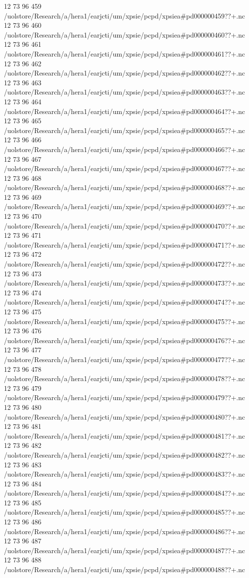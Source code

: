 12 73 96
459
/uolstore/Research/a/hera1/earjcti/um/xpsie/pcpd/xpsiea#pd000000459??+.nc
12 73 96
460
/uolstore/Research/a/hera1/earjcti/um/xpsie/pcpd/xpsiea#pd000000460??+.nc
12 73 96
461
/uolstore/Research/a/hera1/earjcti/um/xpsie/pcpd/xpsiea#pd000000461??+.nc
12 73 96
462
/uolstore/Research/a/hera1/earjcti/um/xpsie/pcpd/xpsiea#pd000000462??+.nc
12 73 96
463
/uolstore/Research/a/hera1/earjcti/um/xpsie/pcpd/xpsiea#pd000000463??+.nc
12 73 96
464
/uolstore/Research/a/hera1/earjcti/um/xpsie/pcpd/xpsiea#pd000000464??+.nc
12 73 96
465
/uolstore/Research/a/hera1/earjcti/um/xpsie/pcpd/xpsiea#pd000000465??+.nc
12 73 96
466
/uolstore/Research/a/hera1/earjcti/um/xpsie/pcpd/xpsiea#pd000000466??+.nc
12 73 96
467
/uolstore/Research/a/hera1/earjcti/um/xpsie/pcpd/xpsiea#pd000000467??+.nc
12 73 96
468
/uolstore/Research/a/hera1/earjcti/um/xpsie/pcpd/xpsiea#pd000000468??+.nc
12 73 96
469
/uolstore/Research/a/hera1/earjcti/um/xpsie/pcpd/xpsiea#pd000000469??+.nc
12 73 96
470
/uolstore/Research/a/hera1/earjcti/um/xpsie/pcpd/xpsiea#pd000000470??+.nc
12 73 96
471
/uolstore/Research/a/hera1/earjcti/um/xpsie/pcpd/xpsiea#pd000000471??+.nc
12 73 96
472
/uolstore/Research/a/hera1/earjcti/um/xpsie/pcpd/xpsiea#pd000000472??+.nc
12 73 96
473
/uolstore/Research/a/hera1/earjcti/um/xpsie/pcpd/xpsiea#pd000000473??+.nc
12 73 96
474
/uolstore/Research/a/hera1/earjcti/um/xpsie/pcpd/xpsiea#pd000000474??+.nc
12 73 96
475
/uolstore/Research/a/hera1/earjcti/um/xpsie/pcpd/xpsiea#pd000000475??+.nc
12 73 96
476
/uolstore/Research/a/hera1/earjcti/um/xpsie/pcpd/xpsiea#pd000000476??+.nc
12 73 96
477
/uolstore/Research/a/hera1/earjcti/um/xpsie/pcpd/xpsiea#pd000000477??+.nc
12 73 96
478
/uolstore/Research/a/hera1/earjcti/um/xpsie/pcpd/xpsiea#pd000000478??+.nc
12 73 96
479
/uolstore/Research/a/hera1/earjcti/um/xpsie/pcpd/xpsiea#pd000000479??+.nc
12 73 96
480
/uolstore/Research/a/hera1/earjcti/um/xpsie/pcpd/xpsiea#pd000000480??+.nc
12 73 96
481
/uolstore/Research/a/hera1/earjcti/um/xpsie/pcpd/xpsiea#pd000000481??+.nc
12 73 96
482
/uolstore/Research/a/hera1/earjcti/um/xpsie/pcpd/xpsiea#pd000000482??+.nc
12 73 96
483
/uolstore/Research/a/hera1/earjcti/um/xpsie/pcpd/xpsiea#pd000000483??+.nc
12 73 96
484
/uolstore/Research/a/hera1/earjcti/um/xpsie/pcpd/xpsiea#pd000000484??+.nc
12 73 96
485
/uolstore/Research/a/hera1/earjcti/um/xpsie/pcpd/xpsiea#pd000000485??+.nc
12 73 96
486
/uolstore/Research/a/hera1/earjcti/um/xpsie/pcpd/xpsiea#pd000000486??+.nc
12 73 96
487
/uolstore/Research/a/hera1/earjcti/um/xpsie/pcpd/xpsiea#pd000000487??+.nc
12 73 96
488
/uolstore/Research/a/hera1/earjcti/um/xpsie/pcpd/xpsiea#pd000000488??+.nc
